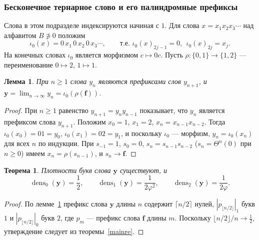 \documentclass[a4paper,14pt]{extreport}
\theoremstyle{plain}
\newtheorem{theorem}{Теорема}[section]
\newtheorem{lemma}{Лемма}[section]
\theoremstyle{definition}
\theoremstyle{remark}
\begin{document}
\subsubsection{Бесконечное тернарное слово и его палиндромные префиксы}\label{sec:Yinf}

Слова в этом подразделе индексируются начиная с $1$. Для слова $x=x_1x_2x_3\cdots$ над
алфавитом $B\not\ni 0$ положим
\begin{equation}
	\iota_0(x)=0\,x_1\,0\,x_2\,0\,x_3\cdots,\qquad\text{т.е. } \iota_0(x)_{2j-1}=0,\ \ \iota_0(x)_{2j}=x_j .
\end{equation}
На конечных словах $\iota_0$ является морфизмом $c\mapsto 0c$. Пусть $\rho:\{0,1\}\to\{1,2\}$ ---
переименование $0\mapsto 2$, $1\mapsto1$.

\begin{lemma}\label{lem:Ystructure}
	При $n\ge1$ слова $y_n$ являются префиксами слов $y_{n+1}$, и $\mathbf y=\lim_{n\to\infty}y_n=\iota_0(\rho(\mathbf f))$.
\end{lemma}
\begin{proof}
	При $n\ge1$ равенство $y_{n+1}=y_ny_{n-1}$ показывает, что $y_n$ является префиксом слова $y_{n+1}$. Положим $x_0=1$, $x_1=2$,
	$x_n=x_{n-1}x_{n-2}$. Тогда $\iota_0(x_0)=01=y_0$, $\iota_0(x_1)=02=y_1$, и поскольку $\iota_0$ --- морфизм,
	$y_n=\iota_0(x_n)$ для всех $n$ по индукции. При $s_{-1}=1$, $s_0=0$, $s_n=s_{n-1}s_{n-2}$
	($s_n=\Theta^n(0)$ при $n\ge0$) имеем $x_n=\rho(s_{n-1})$, и $s_{n}\to\mathbf f$.
\end{proof}

\begin{theorem}\label{thm:Yinf}
	Плотности букв слова $\mathbf y$ существуют, и
	\begin{equation}
		\operatorname{dens}_0(\mathbf y)=\frac12,\qquad
		\operatorname{dens}_1(\mathbf y)=\frac1{2\varphi^{2}},\qquad
		\operatorname{dens}_2(\mathbf y)=\frac1{2\varphi}.
	\end{equation}
\end{theorem}
\begin{proof}
	По лемме~\ref{lem:Ystructure} префикс слова $\mathbf y$ длины $n$ содержит $\lceil n/2\rceil$ нулей,
	$|p_{\lfloor n/2\rfloor}|_1$ букв $1$ и $|p_{\lfloor n/2\rfloor}|_0$ букв $2$, где
	$p_m$ --- префикс слова $\mathbf f$ длины $m$. Поскольку $\lfloor n/2\rfloor/n\to\frac12$, утверждение следует
	из теоремы~\ref{mainre}.
\end{proof}
\end{document}
